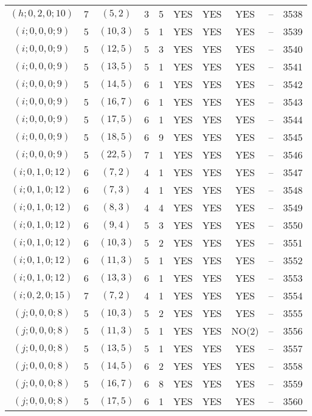 \begin{longtable}{|c|c|c|c|c|c|c|c|c|c|}
$(h; 0, 2, 0; 10)$ & 7 & $(5, 2)$ & 3 & 5 & YES & YES & YES & -- & 3538\\
$(i; 0, 0, 0; 9)$ & 5 & $(10, 3)$ & 5 & 1 & YES & YES & YES & -- & 3539\\
$(i; 0, 0, 0; 9)$ & 5 & $(12, 5)$ & 5 & 3 & YES & YES & YES & -- & 3540\\
$(i; 0, 0, 0; 9)$ & 5 & $(13, 5)$ & 5 & 1 & YES & YES & YES & -- & 3541\\
$(i; 0, 0, 0; 9)$ & 5 & $(14, 5)$ & 6 & 1 & YES & YES & YES & -- & 3542\\
$(i; 0, 0, 0; 9)$ & 5 & $(16, 7)$ & 6 & 1 & YES & YES & YES & -- & 3543\\
$(i; 0, 0, 0; 9)$ & 5 & $(17, 5)$ & 6 & 1 & YES & YES & YES & -- & 3544\\
$(i; 0, 0, 0; 9)$ & 5 & $(18, 5)$ & 6 & 9 & YES & YES & YES & -- & 3545\\
$(i; 0, 0, 0; 9)$ & 5 & $(22, 5)$ & 7 & 1 & YES & YES & YES & -- & 3546\\
$(i; 0, 1, 0; 12)$ & 6 & $(7, 2)$ & 4 & 1 & YES & YES & YES & -- & 3547\\
$(i; 0, 1, 0; 12)$ & 6 & $(7, 3)$ & 4 & 1 & YES & YES & YES & -- & 3548\\
$(i; 0, 1, 0; 12)$ & 6 & $(8, 3)$ & 4 & 4 & YES & YES & YES & -- & 3549\\
$(i; 0, 1, 0; 12)$ & 6 & $(9, 4)$ & 5 & 3 & YES & YES & YES & -- & 3550\\
$(i; 0, 1, 0; 12)$ & 6 & $(10, 3)$ & 5 & 2 & YES & YES & YES & -- & 3551\\
$(i; 0, 1, 0; 12)$ & 6 & $(11, 3)$ & 5 & 1 & YES & YES & YES & -- & 3552\\
$(i; 0, 1, 0; 12)$ & 6 & $(13, 3)$ & 6 & 1 & YES & YES & YES & -- & 3553\\
$(i; 0, 2, 0; 15)$ & 7 & $(7, 2)$ & 4 & 1 & YES & YES & YES & -- & 3554\\
$(j; 0, 0, 0; 8)$ & 5 & $(10, 3)$ & 5 & 2 & YES & YES & YES & -- & 3555\\
$(j; 0, 0, 0; 8)$ & 5 & $(11, 3)$ & 5 & 1 & YES & YES & NO(2) & -- & 3556\\
$(j; 0, 0, 0; 8)$ & 5 & $(13, 5)$ & 5 & 1 & YES & YES & YES & -- & 3557\\
$(j; 0, 0, 0; 8)$ & 5 & $(14, 5)$ & 6 & 2 & YES & YES & YES & -- & 3558\\
$(j; 0, 0, 0; 8)$ & 5 & $(16, 7)$ & 6 & 8 & YES & YES & YES & -- & 3559\\
$(j; 0, 0, 0; 8)$ & 5 & $(17, 5)$ & 6 & 1 & YES & YES & YES & -- & 3560\\

\end{longtable}
